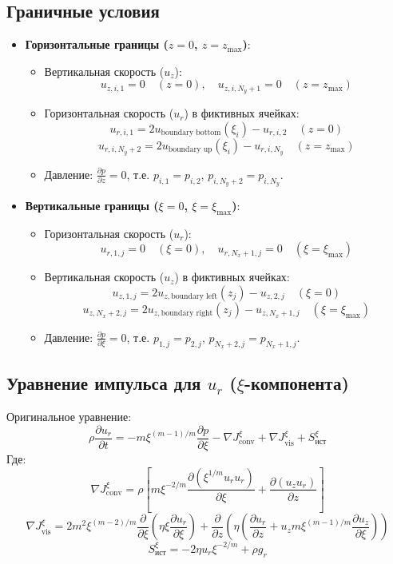 \documentclass[a4paper,12pt]{article}
\begin{document}
\subsection*{Граничные условия}
\begin{itemize}
    \item \textbf{Горизонтальные границы (\(z = 0\), \(z = z_{\text{max}}\))}:
    \begin{itemize}
        \item Вертикальная скорость (\(u_z\)): 
        \[
        u_{z,i,1} = 0 \quad (z=0), \quad u_{z,i,N_y+1} = 0 \quad (z=z_{\text{max}})
        \]
        \item Горизонтальная скорость (\(u_r\)) в фиктивных ячейках:
        \[
        u_{r,i,1} = 2 u_{\text{boundary bottom}}(\xi_i) - u_{r,i,2} \quad (z=0)
        \]
        \[
        u_{r,i,N_y+2} = 2 u_{\text{boundary up}}(\xi_i) - u_{r,i,N_y} \quad (z=z_{\text{max}})
        \]
        \item Давление: \(\frac{\partial p}{\partial z} = 0\), т.е. \(p_{i,1} = p_{i,2}\), \(p_{i,N_y+2} = p_{i,N_y}\).
    \end{itemize}
    \item \textbf{Вертикальные границы (\(\xi = 0\), \(\xi = \xi_{\text{max}}\))}:
    \begin{itemize}
        \item Горизонтальная скорость (\(u_r\)):
        \[
        u_{r,1,j} = 0 \quad (\xi=0), \quad u_{r,N_x+1,j} = 0 \quad (\xi=\xi_{\text{max}})
        \]
        \item Вертикальная скорость (\(u_z\)) в фиктивных ячейках:
        \[
        u_{z,1,j} = 2 u_{z,\text{boundary left}}(z_j) - u_{z,2,j} \quad (\xi=0)
        \]
        \[
        u_{z,N_x+2,j} = 2 u_{z,\text{boundary right}}(z_j) - u_{z,N_x+1,j} \quad (\xi=\xi_{\text{max}})
        \]
        \item Давление: \(\frac{\partial p}{\partial \xi} = 0\), т.е. \(p_{1,j} = p_{2,j}\), \(p_{N_x+2,j} = p_{N_x+1,j}\).
    \end{itemize}
\end{itemize}

\subsection*{Уравнение импульса для \(u_r\) (\(\xi\)-компонента)}
Оригинальное уравнение:
\[
\rho \frac{\partial u_r}{\partial t} = - m \xi^{(m-1)/m} \frac{\partial p}{\partial \xi} - \nabla J_{\text{conv}}^\xi + \nabla J_{\text{vis}}^\xi + S_{\text{ист}}^\xi
\]
Где:
\[
\nabla J_{\text{conv}}^\xi = \rho \left[ m \xi^{-2/m} \frac{\partial (\xi^{1/m} u_r u_r)}{\partial \xi} + \frac{\partial (u_z u_r)}{\partial z} \right]
\]
\[
\nabla J_{\text{vis}}^\xi = 2 m^2 \xi^{(m-2)/m} \frac{\partial}{\partial \xi} \left( \eta \xi \frac{\partial u_r}{\partial \xi} \right) + \frac{\partial}{\partial z} \left( \eta \left( \frac{\partial u_r}{\partial z} + u_z m \xi^{(m-1)/m} \frac{\partial u_z}{\partial \xi} \right) \right)
\]
\[
S_{\text{ист}}^\xi = -2 \eta u_r \xi^{-2/m} + \rho g_r
\]
\end{document}
